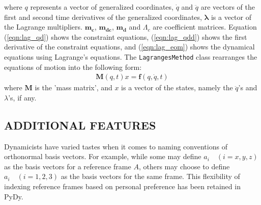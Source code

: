 \documentclass[twocolumn,10pt]{asme2e}
\begin{document}
where $q$ represents a vector of generalized coordinates, $\dot{q}$ and
$\ddot{q}$ are vectors of the first and second time derivatives of the
generalized coordinates, $\mathbf{\lambda}$ is a vector of the Lagrange
multipliers. $\mathbf{m_c}$, $\mathbf{m_{dc}}$, $\mathbf{m_d}$ and
$\Lambda_c$ are coefficient matrices.
Equation (\ref{eqn:lag_qd}) shows the constraint equations,
(\ref{eqn:lag_qdd}) shows the
first derivative of the constraint equations, and (\ref{eqn:lag_eom}) shows
the dynamical equations using Lagrange's equations. The
\verb|LagrangesMethod| class rearranges the equations of motion into the
following form:
\label{eqn:lag_rearr}
\begin{align}
    \mathbf{M}(q, t) x = \mathbf{f}(q, \dot{q}, t)
\end{align}
where $\mathbf{M}$ is the 'mass matrix', and $x$ is a vector of the states,
namely the $\ddot{q}$'s and $\lambda$'s, if any.

\subsection*{ADDITIONAL FEATURES}
Dynamicists have varied tastes when it comes to naming conventions of
orthonormal basis vectors. For example, while some may define $a_i
\quad (i=x,y,z)$ as the basis vectors for a reference frame $A$, others may
choose to define $a_i \quad (i=1,2,3)$ as the basis vectors for the same frame.
This flexibility of indexing reference frames based on personal preference has
been retained in PyDy.

%
\end{document}
